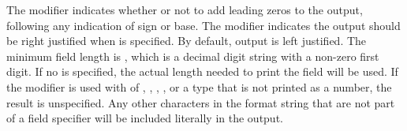 The  modifier indicates whether or not to add leading zeros to the 
output, following any indication of sign or base. The  modifier 
indicates the output should be right justified when  is specified.
By default, output is left justified. The minimum field length is , 
which is a decimal digit string with a non-zero first digit. If no  
is specified, the actual length needed to print the field will be used.
If the  modifier is used with  of , 
{}, , {}, or a type that 
is not printed as a number, the result is unspecified. Any other characters 
in the format string that are not part of a field specifier will be included 
literally in the output.

\nolinenumbers
\renewcommand{\arraystretch}{1.5}
\tablelasttail{\hline}
